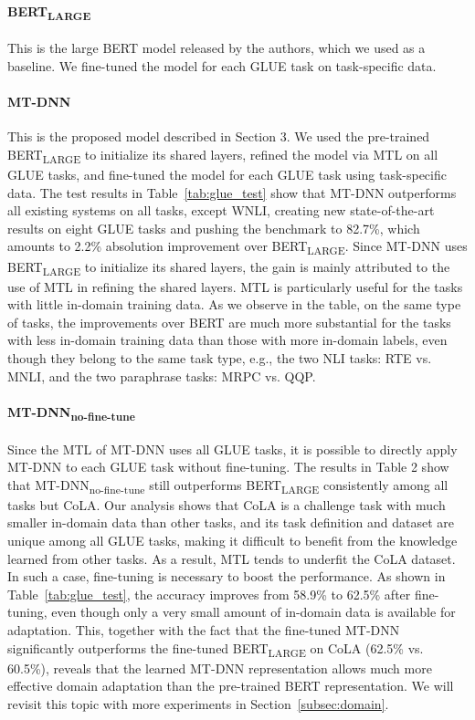 \paragraph{BERT\textsubscript{LARGE}} This is the large BERT model released by the authors, which we used as a baseline. We fine-tuned the model for each GLUE task on task-specific data.

\paragraph{MT-DNN} This is the proposed model described in Section 3. We used the pre-trained BERT\textsubscript{LARGE} to initialize its shared layers, refined the model via MTL on all GLUE tasks, and fine-tuned the model for each GLUE task using task-specific data. The test results in Table~\ref{tab:glue_test} show that MT-DNN outperforms all existing systems on all tasks, except WNLI, creating new state-of-the-art results on eight GLUE tasks and pushing the benchmark to 82.7\%, which amounts to 2.2\% absolution improvement over BERT\textsubscript{LARGE}. Since MT-DNN uses BERT\textsubscript{LARGE} to initialize its shared layers, the gain is mainly attributed to the use of MTL in refining the shared layers. 
MTL is particularly useful for the tasks with little in-domain training data. 
As we observe in the table, on the same type of tasks, the improvements over BERT are much more substantial for the tasks with less in-domain training data than those with more in-domain labels, even though they belong to the same task type, e.g., the two NLI tasks: RTE vs. MNLI, and the two paraphrase tasks: MRPC vs. QQP.

\paragraph{MT-DNN\textsubscript{no-fine-tune}} Since the MTL of MT-DNN uses all GLUE tasks, it is possible to directly apply MT-DNN to each GLUE task without fine-tuning.
The results in Table 2 show that MT-DNN\textsubscript{no-fine-tune} still outperforms BERT\textsubscript{LARGE} consistently among all tasks but CoLA. Our analysis shows that CoLA is a challenge task with much smaller in-domain data than other tasks, and its task definition and dataset are unique among all GLUE tasks, making it difficult to benefit from the knowledge learned from other tasks. As a result, MTL tends to underfit the CoLA dataset. In such a case, fine-tuning is necessary to boost the performance. As shown in Table~\ref{tab:glue_test}, the accuracy improves from 58.9\% to 62.5\% after fine-tuning, even though only a very small amount of in-domain data is available for adaptation. This, together with the fact that the fine-tuned MT-DNN significantly outperforms the fine-tuned BERT\textsubscript{LARGE} on CoLA (62.5\% vs. 60.5\%), reveals that the learned MT-DNN representation allows much more effective domain adaptation than the pre-trained BERT representation. We will revisit this topic with more experiments in Section~\ref{subsec:domain}.

